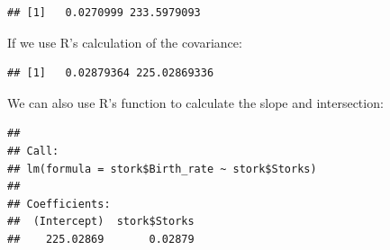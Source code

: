 \documentclass[
]{article}
\newenvironment{Shaded}{\begin{snugshade}}{\end{snugshade}}
\newcommand{\DecValTok}[1]{\textcolor[rgb]{0.00,0.00,0.81}{#1}}
\newcommand{\FunctionTok}[1]{\textcolor[rgb]{0.00,0.00,0.00}{#1}}
\newcommand{\NormalTok}[1]{#1}
\newcommand{\OtherTok}[1]{\textcolor[rgb]{0.56,0.35,0.01}{#1}}
\newcommand{\SpecialCharTok}[1]{\textcolor[rgb]{0.00,0.00,0.00}{#1}}
\begin{document}
\begin{Shaded}
\end{Shaded}

\begin{verbatim}
## [1]   0.0270999 233.5979093
\end{verbatim}

If we use R's calculation of the covariance:

\begin{Shaded}
\end{Shaded}

\begin{verbatim}
## [1]   0.02879364 225.02869336
\end{verbatim}

We can also use R's function to calculate the slope and intersection:

\begin{Shaded}
\end{Shaded}

\begin{verbatim}
## 
## Call:
## lm(formula = stork$Birth_rate ~ stork$Storks)
## 
## Coefficients:
##  (Intercept)  stork$Storks  
##    225.02869       0.02879
\end{verbatim}
\end{document}
